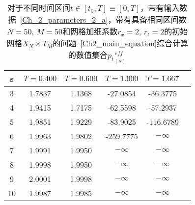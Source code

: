 \documentclass[twoside]{book}
\begin{document}
\begin{CJK*}{GBK}{song}
\begin{table}
		\begin{center}
			\begin{tabular}{c||c|c|c|c|c}
				s & $T = 0.400$ & $T = 0.600$ & $T = 1.000$ & $T = 1.667$ \\
				\hline\hline
				3 & 1.7837 & 1.1368 & -27.0854 & -36.3775 \\
				4 & 1.9415 & 1.7175 & -62.5598 & -57.2937 \\
				5 & 1.9851 & 1.9229 & -83.9025 & -116.6789 \\
				6 & 1.9963 & 1.9802 & -259.7775 & $-\infty$ \\
				7 & 1.9991 & 1.9950 & $-\infty$ & $-\infty$ \\
				8 & 1.9998 & 1.9950 & $-\infty$ & $-\infty$ \\
				9 & 2.0001 & 1.9998 & $-\infty$ & $-\infty$ \\
				10 & 1.9987 & 1.9985 & $-\infty$ & $-\infty$ \\
			\end{tabular}
		\end{center}
		\caption{对于不同时间区间$t \in [t_0,T] \equiv [0,T]$，带有输入数据~\eqref{Ch_2_parameters_2_a}，带有具备相同区间数 $N = 50$, $M = 50$和网格加细系数$r_x = 2$, $r_t = 2$的初始网格$X_N \times T_M$的问题~\eqref{Ch2_main_equation}综合计算的数值集合${p_t}^{\, eff}_{(s)}$}
		\label{Table_2_1}
\end{table}

\end{CJK*}
\end{document}
